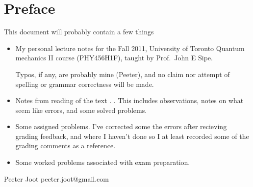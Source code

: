 \chapter*{Preface}\normalsize

This document will probably contain a few things

\begin{itemize}
\item My personal lecture notes for the Fall 2011, University of Toronto Quantum mechanics II course (PHY456H1F), taught by Prof.\ John E Sipe.

Typos, if any, are probably mine (Peeter), and no claim nor attempt of spelling or grammar correctness will be made.

\item Notes from reading of the text \citep{desai2009quantum}.  .  This includes observations, notes on what seem like errors, and some solved problems.

\item Some assigned problems.  I've corrected some the errors after recieving grading feedback, and where I haven't done so I at least recorded some of the grading comments as a reference.

\item Some worked problems associated with exam preparation.

\end{itemize}

Peeter Joot  \quad peeter.joot@gmail.com 

